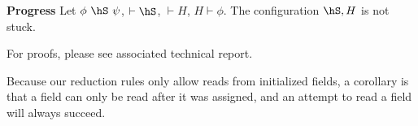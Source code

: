 \begin{Theorem}{\textbf{Progress}}
Let $\phi~\hS~\psi$, $\vdash \hS$, $\vdash H$, $H \vdash \phi$.
The configuration $\hS,H$ is not stuck.
\end{Theorem}

For proofs, please see associated technical report.

Because our reduction rules only allow reads from initialized fields,
a corollary is that a field can only be read after it was assigned,
and an attempt to read a field will always succeed.
